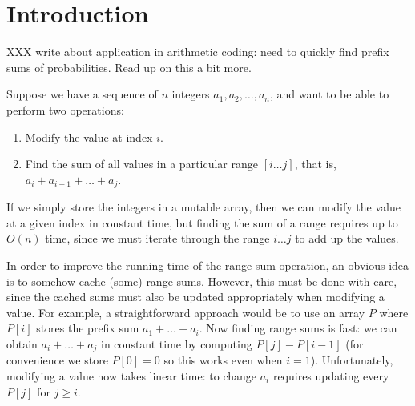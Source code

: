 \documentclass[acmsmall,review]{acmart}\settopmatter{printfolios=true,printccs=false,printacmref=false}
\begin{document}




\maketitle


\section{Introduction}

XXX write about application in arithmetic coding: need to quickly find
prefix sums of probabilities.  Read up on this a bit more.

Suppose we have a sequence of $n$ integers $a_1, a_2, \dots, a_n$, and
want to be able to perform two operations:

\begin{enumerate}[label=(\Alph*)]
\item Modify the value at index $i$.
\item Find the sum of all values in a particular range $[i \dots j]$,
  that is, $a_i + a_{i+1} + \dots + a_j$.
\end{enumerate}

If we simply store the integers in a mutable array, then we can modify
the value at a given index in constant time, but finding the sum of a
range requires up to $O(n)$ time, since we must iterate through the
range $i \dots j$ to add up the values.

In order to improve the running time of the range sum operation, an
obvious idea is to somehow cache (some) range sums.  However, this
must be done with care, since the cached sums must also be updated
appropriately when modifying a value.  For example, a straightforward
approach would be to use an array $P$ where $P[i]$ stores the prefix
sum $a_1 + \dots + a_i$.  Now finding range sums is fast: we can
obtain $a_i + \dots + a_j$ in constant time by computing
$P[j] - P[i-1]$ (for convenience we store $P[0] = 0$ so this works
even when $i=1$).  Unfortunately, modifying a value now takes linear
time: to change $a_i$ requires updating every $P[j]$ for $j \geq i$.
\end{document}

